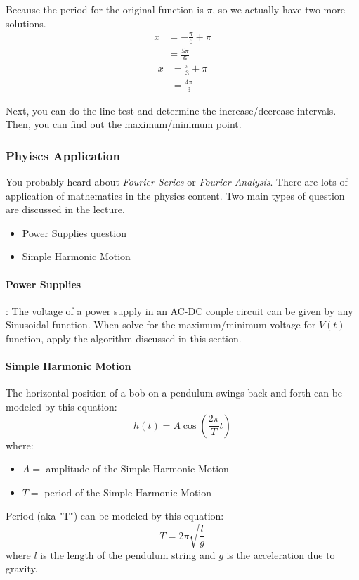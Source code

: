 \begin{example}
    Because the period for the original function is $\pi$, so we actually have two more solutions.
    \begin{align*}
        x &= -\frac{\pi}{6} + \pi \\
         &= \frac{5\pi}{6}
    \end{align*}
    \begin{align*}
        x &= \frac{\pi}{3} + \pi \\
         &= \frac{4\pi}{3}
    \end{align*}

    Next, you can do the line test and determine the increase/decrease intervals. 
    Then, you can find out the maximum/minimum point. 
\end{example}

\subsubsection{Phyiscs Application}
You probably heard about \textit{Fourier Series} or \textit{Fourier Analysis}. 
There are lots of application of mathematics in the physics content. 
Two main types of question are discussed in the lecture.

\begin{center}
    \begin{itemize}
        \item Power Supplies question
        \item Simple Harmonic Motion
    \end{itemize}
\end{center}

\paragraph{Power Supplies} :
    The voltage of a power supply in an AC-DC couple circuit can be given by any Sinusoidal function. 
When solve for the maximum/minimum voltage for $V(t)$ function, apply the algorithm discussed in this section. 


\paragraph{Simple Harmonic Motion}

The horizontal position of a bob on a pendulum swings back and forth can be modeled by this equation:
\begin{displaymath}
    h(t) = A\cos(\frac{2\pi}{T}t)
\end{displaymath}
where:
\begin{center}
    \begin{itemize}
        \item $A = $ amplitude of the Simple Harmonic Motion
        \item $T = $ period of the Simple Harmonic Motion
    \end{itemize}
\end{center}

Period (aka "T") can be modeled by this equation:
\begin{displaymath}
    T = 2\pi\sqrt{\frac{l}{g}}
\end{displaymath}
where $l$ is the length of the pendulum string and $g$ is the acceleration due to gravity.

